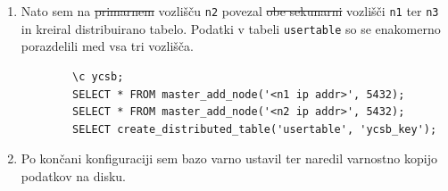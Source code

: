 \documentclass[a4paper, 12pt]{book}
\providecommand{\DIFaddtex}[1]{{\protect\color{blue}\uwave{#1}}} %
\providecommand{\DIFdeltex}[1]{{\protect\color{red}\sout{#1}}}                      %
\providecommand{\DIFaddbegin}{} %
\providecommand{\DIFaddend}{} %
\providecommand{\DIFdelbegin}{} %
\providecommand{\DIFdelend}{} %
\providecommand{\DIFadd}[1]{\texorpdfstring{\DIFaddtex{#1}}{#1}} %
\providecommand{\DIFdel}[1]{\texorpdfstring{\DIFdeltex{#1}}{}} %
\newcommand{\DIFscaledelfig}{0.5}
\newlength{\DIFdelgraphicswidth} %
\newlength{\DIFdelgraphicsheight} %
\newcommand{\DIFaddincludegraphics}[2][]{{\color{blue}\fbox{\DIFOincludegraphics[#1]{#2}}}} %
\newcommand{\DIFdelincludegraphics}[2][]{%
\sbox{\DIFdelgraphicsbox}{\DIFOincludegraphics[#1]{#2}}%
\settoboxwidth{\DIFdelgraphicswidth}{\DIFdelgraphicsbox} %
\settoboxtotalheight{\DIFdelgraphicsheight}{\DIFdelgraphicsbox} %
\scalebox{\DIFscaledelfig}{%
\parbox[b]{\DIFdelgraphicswidth}{\usebox{\DIFdelgraphicsbox}\\[-\baselineskip] \rule{\DIFdelgraphicswidth}{0em}}\llap{\resizebox{\DIFdelgraphicswidth}{\DIFdelgraphicsheight}{%
\setlength{\unitlength}{\DIFdelgraphicswidth}%
\begin{picture}(1,1)%
\thicklines\linethickness{2pt} %
{\color[rgb]{1,0,0}\put(0,0){\framebox(1,1){}}}%
{\color[rgb]{1,0,0}\put(0,0){\line( 1,1){1}}}%
{\color[rgb]{1,0,0}\put(0,1){\line(1,-1){1}}}%
\end{picture}%
}\hspace*{3pt}}} %
} %
\DeclareRobustCommand{\DIFaddbegin}{\DIFOaddbegin \let\includegraphics\DIFaddincludegraphics} %
\DeclareRobustCommand{\DIFaddend}{\DIFOaddend \let\includegraphics\DIFOincludegraphics} %
\DeclareRobustCommand{\DIFdelbegin}{\DIFOdelbegin \let\includegraphics\DIFdelincludegraphics} %
\DeclareRobustCommand{\DIFdelend}{\DIFOaddend \let\includegraphics\DIFOincludegraphics} %
\begin{document}
\begin{enumerate}
    \item Nato sem na \DIFdelbegin \DIFdel{primarnem }\DIFdelend vozlišču \texttt{n2} povezal \DIFdelbegin \DIFdel{obe sekunarni }\DIFdelend \DIFaddbegin \DIFadd{še }\DIFaddend vozlišči \texttt{n1} ter \texttt{n3} in kreiral distribuirano tabelo. Podatki v tabeli \texttt{usertable} so se enakomerno porazdelili med vsa tri vozlišča.
    \begin{listing}[H]
    \begin{verbatim}
        \c ycsb;
        SELECT * FROM master_add_node('<n1 ip addr>', 5432);
        SELECT * FROM master_add_node('<n2 ip addr>', 5432);
        SELECT create_distributed_table('usertable', 'ycsb_key');
    \end{verbatim}
    \label{code-ycsb-add-node-citus}
    \end{listing}
    \item Po končani konfiguraciji sem bazo varno ustavil ter naredil varnostno kopijo podatkov na disku.
\end{enumerate}
\end{document}
